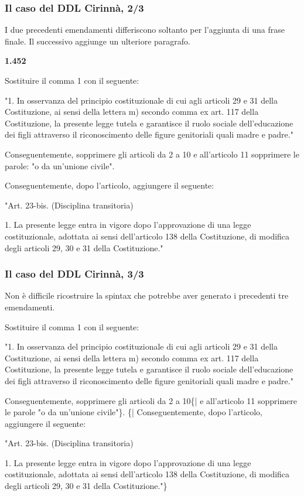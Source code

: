\documentclass[12pt]{beamer}
\begin{document}
  \begin{frame}[fragile]
    \frametitle{Il caso del DDL Cirinnà, 2/3}

    I due precedenti emendamenti differiscono soltanto per l'aggiunta di una
    frase finale. Il successivo aggiunge un ulteriore paragrafo.

    \vspace{0.25cm}

    \fontsize{2pt}{3}
    \textbf{1.452}
    \begin{semiverbatim}Sostituire il comma 1 con il seguente:

  "1. In osservanza del principio costituzionale di cui agli articoli 29 e 31
      della Costituzione, ai sensi della lettera m) secondo comma ex art. 117
      della Costituzione, la presente legge tutela e garantisce il ruolo sociale
      dell'educazione dei figli attraverso il riconoscimento delle figure
      genitoriali quali madre e padre."

Conseguentemente, sopprimere gli articoli da 2 a 10 e all'articolo 11 sopprimere
le parole: "o da un'unione civile".

Conseguentemente, dopo l'articolo, aggiungere il seguente:

  "Art. 23-bis. (Disciplina transitoria)

  1. La presente legge entra in vigore dopo l'approvazione di una legge
     costituzionale, adottata ai sensi dell'articolo 138 della Costituzione, di
     modifica degli articoli 29, 30 e 31 della Costituzione."
\end{semiverbatim}
\end{frame}

  \begin{frame}[fragile]
    \frametitle{Il caso del DDL Cirinnà, 3/3}

    Non è difficile ricostruire la spintax che potrebbe aver generato i
    precedenti tre emendamenti.

    \vspace{0.25cm}

    \fontsize{2pt}{3}
    \begin{semiverbatim}Sostituire il comma 1 con il seguente:

  "1. In osservanza del principio costituzionale di cui agli articoli 29 e 31
      della Costituzione, ai sensi della lettera m) secondo comma ex art. 117
      della Costituzione, la presente legge tutela e garantisce il ruolo sociale
      dell’educazione dei figli attraverso il riconoscimento delle figure
      genitoriali quali madre e padre."

Conseguentemente, sopprimere gli articoli da 2 a 10\{| e all'articolo 11
sopprimere le parole "o da un'unione civile"\}.
\{|
Conseguentemente, dopo l'articolo, aggiungere il seguente:

  "Art. 23-bis. (Disciplina transitoria)

  1. La presente legge entra in vigore dopo l'approvazione di una legge
     costituzionale, adottata ai sensi dell'articolo 138 della Costituzione, di
     modifica degli articoli 29, 30 e 31 della Costituzione."\}
\end{semiverbatim}
\end{frame}
\end{document}
